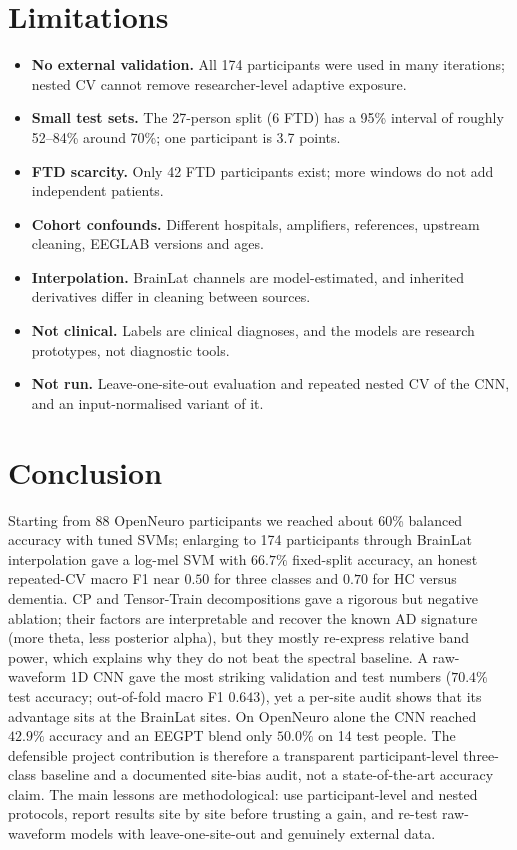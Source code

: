 \documentclass[10pt,twocolumn,a4paper]{article}
\begin{document}
\section{Limitations}
\label{sec:limits}
\begin{itemize}
\item \textbf{No external validation.} All 174 participants were used in many iterations; nested CV cannot remove researcher-level adaptive exposure.
\item \textbf{Small test sets.} The 27-person split (6 FTD) has a 95\% interval of roughly 52--84\% around 70\%; one participant is 3.7 points.
\item \textbf{FTD scarcity.} Only 42 FTD participants exist; more windows do not add independent patients.
\item \textbf{Cohort confounds.} Different hospitals, amplifiers, references, upstream cleaning, EEGLAB versions and ages.
\item \textbf{Interpolation.} BrainLat channels are model-estimated, and inherited derivatives differ in cleaning between sources.
\item \textbf{Not clinical.} Labels are clinical diagnoses, and the models are research prototypes, not diagnostic tools.
\item \textbf{Not run.} Leave-one-site-out evaluation and repeated nested CV of the CNN, and an input-normalised variant of it.
\end{itemize}

\section{Conclusion}
\label{sec:conclusion}
Starting from 88 OpenNeuro participants we reached about 60\% balanced accuracy with tuned SVMs; enlarging to 174 participants through BrainLat interpolation gave a log-mel SVM with $66.7\%$ fixed-split accuracy, an honest repeated-CV macro F1 near $0.50$ for three classes and $0.70$ for HC versus dementia. CP and Tensor-Train decompositions gave a rigorous but negative ablation; their factors are interpretable and recover the known AD signature (more theta, less posterior alpha), but they mostly re-express relative band power, which explains why they do not beat the spectral baseline. A raw-waveform 1D CNN gave the most striking validation and test numbers ($70.4\%$ test accuracy; out-of-fold macro F1 $0.643$), yet a per-site audit shows that its advantage sits at the BrainLat sites. On OpenNeuro alone the CNN reached $42.9\%$ accuracy and an EEGPT blend only $50.0\%$ on 14 test people. The defensible project contribution is therefore a transparent participant-level three-class baseline and a documented site-bias audit, not a state-of-the-art accuracy claim. The main lessons are methodological: use participant-level and nested protocols, report results site by site before trusting a gain, and re-test raw-waveform models with leave-one-site-out and genuinely external data.
\end{document}
